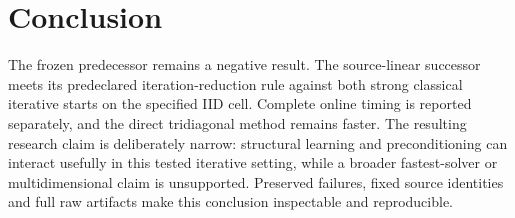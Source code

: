 \section{Conclusion}
The frozen predecessor remains a negative result. The source-linear successor meets its predeclared iteration-reduction rule against both strong classical iterative starts on the specified IID cell. Complete online timing is reported separately, and the direct tridiagonal method remains faster. The resulting research claim is deliberately narrow: structural learning and preconditioning can interact usefully in this tested iterative setting, while a broader fastest-solver or multidimensional claim is unsupported. Preserved failures, fixed source identities and full raw artifacts make this conclusion inspectable and reproducible.
